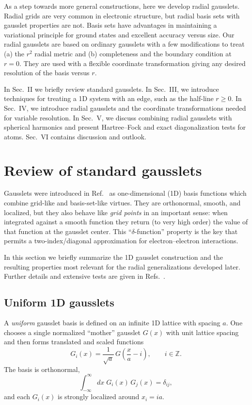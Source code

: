 \documentclass[aps,pra,reprint,longbibliography,nofootinbib]{revtex4-2}
\begin{document}
As a step towards more general constructions, here we develop radial gausslets.  Radial grids are very common in electronic structure, but radial basis sets with gausslet properties are not. Basis sets have advantages in maintaining a variational principle for ground states and excellent accuracy versus size. Our radial gausslets are based on ordinary gausslets with a few modifications to treat (a) the $r^2$ radial metric and (b) completeness and the boundary condition at $r=0$.  They are used with a flexible coordinate transformation giving any desired resolution of the basis versus $r$. 

In Sec.~II we briefly review standard gausslets. In Sec.~III, we introduce techniques for treating a 1D system with an edge, such as the half-line $r\ge 0$. In Sec.~IV, we introduce radial gausslets and the coordinate transformations needed for variable resolution. In Sec.~V, we discuss combining radial gausslets with spherical harmonics and present Hartree--Fock and exact diagonalization tests for atoms. Sec.~VI contains discussion and outlook.

\section{Review of standard gausslets}

\label{sec:stdgausslets}

Gausslets were introduced in Ref.~\cite{White17} as one-dimensional (1D) basis functions which
combine grid-like and basis-set-like virtues.  They are orthonormal, smooth, and localized, but
they also behave like \emph{grid points} in an important sense: when integrated against a smooth
function they return (to very high order) the value of that function at the gausslet center.
This ``$\delta$-function'' property is the key that permits a two-index/diagonal approximation for
electron--electron interactions.

In this section we briefly summarize the 1D gausslet construction and the resulting properties
most relevant for the radial generalizations developed later.  Further details and extensive tests
are given in Refs.~\cite{White17,WhiteStoudenmire2019MultiSliced,QiuWhite2021Hybrid,White2023}.

\subsection{Uniform 1D gausslets}

A \emph{uniform} gausslet basis is defined on an infinite 1D lattice with spacing $a$.
One chooses a single normalized ``mother'' gausslet $G(x)$ with unit lattice spacing and then forms
translated and scaled functions
\begin{equation}
  G_i(x) = \frac{1}{\sqrt{a}}\, G\!\left(\frac{x}{a}-i\right),
  \qquad i \in \mathbb{Z}.
  \label{eq:Gi_def}
\end{equation}
The basis is orthonormal,
\begin{equation}
  \int_{-\infty}^{\infty} dx\; G_i(x)\,G_j(x) = \delta_{ij},
  \label{eq:orthonorm}
\end{equation}
and each $G_i(x)$ is strongly localized around $x_i = ia$.
\end{document}
